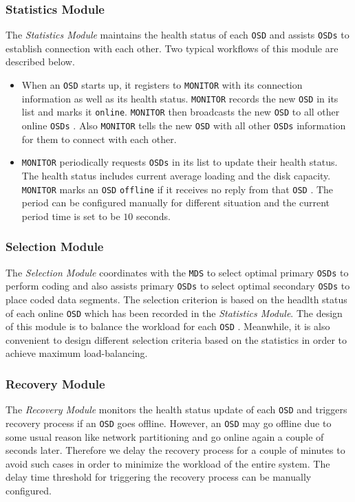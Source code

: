 \documentclass{article}
\def\osd{\texttt{OSD} }
\def\osds{\texttt{OSDs} }
\def\mds{\texttt{MDS} }
\def\monitor{\texttt{MONITOR} }
\begin{document}
\subsubsection{Statistics Module}
The \textit{Statistics Module} maintains the health status of 
each \osd and assists \osds to establish connection with each
other. Two typical workflows of this module are described below.
\begin{itemize}
	\item When an \osd starts up, it registers to \monitor with its
		connection information as well as its health status. \monitor records
		the new \osd in its list and marks it \texttt{online}. \monitor then
		broadcasts the new \osd to all other online \osds. Also \monitor
		tells the new \osd with all other \osds information for them 
		to connect with each other. 
	\item \monitor periodically requests \osds in its list to update their
		health status. The health status includes current average loading and
		the disk capacity. \monitor marks an \osd \texttt{offline} if it
		receives no reply from that \osd. 
		The period can be configured manually for different
		situation and the current period time is set to be $10$ seconds.
\end{itemize}

\subsubsection{Selection Module}
The \textit{Selection Module} coordinates with the \mds to select
optimal primary \osds to perform coding and also assists primary 
\osds to select optimal secondary \osds to place coded data segments.
The selection criterion is based on the headlth
status of each online \osd which has been recorded in the 
\textit{Statistics Module}. The design of this module is to balance the workload
for each \osd. Meanwhile, it is also convenient to design different 
selection criteria based on
the statistics in order to achieve maximum load-balancing.

\subsubsection{Recovery Module}
The \textit{Recovery Module} monitors the health status update of each \osd and
triggers recovery process if an \osd goes offline. However, an \osd may go offline
due to some usual reason like network partitioning and go online again a couple 
of seconds later. Therefore we delay the recovery process for a couple of minutes
to avoid such cases in order to minimize the workload of the entire system. The
delay time threshold for triggering the recovery process can be manually 
configured.
\end{document}
